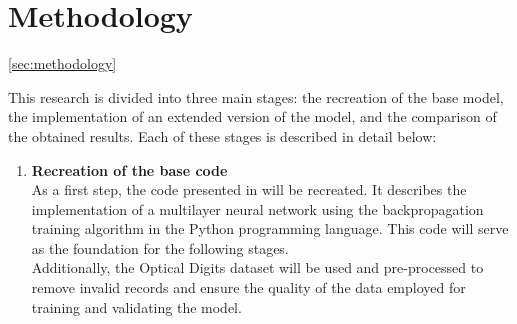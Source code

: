 \section{Methodology} \ref{sec:methodology}

This research is divided into three main stages: the recreation of the base model, the implementation of an extended version of the model, and the comparison of the obtained results. Each of these stages is described in detail below:

\begin{enumerate}
    \item \textbf{Recreation of the base code} \\
    As a first step, the code presented in \cite{bullinaria2009} will be recreated. It describes the implementation of a multilayer neural network using the backpropagation training algorithm in the Python programming language. This code will serve as the foundation for the following stages. \\
    Additionally, the Optical Digits dataset will be used and pre-processed to remove invalid records and ensure the quality of the data employed for training and validating the model.


\end{enumerate}
